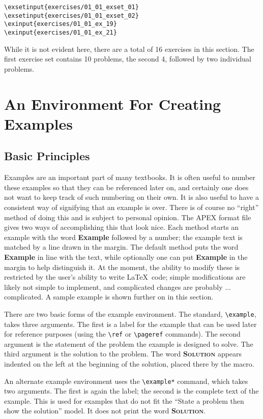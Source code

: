 \documentclass[10pt]{article}
\begin{document}
\begin{verbatim}
\exsetinput{exercises/01_01_exset_01}
\exsetinput{exercises/01_01_exset_02}
\exinput{exercises/01_01_ex_19}
\exinput{exercises/01_01_ex_21}
\end{verbatim}

While it is not evident here, there are a total of 16 exercises in this section. The first exercise set contains 10 problems, the second 4, followed by two individual problems. 

\section{An Environment For Creating Examples}

\subsection{Basic Principles}
Examples are an important part of many textbooks. It is often useful to number these examples so that they can be referenced later on, and certainly one does not want to keep track of such numbering on their own. It is also useful to have a consistent way of signifying that an example is over. There is of course no ``right'' method of doing this and is subject to personal opinion. The APEX format file gives two ways of accomplishing this that look nice. Each method starts an example with the word {\bf Example} followed by a number; the example text is matched by a line drawn in the margin. The default method puts the word {\bf Example} in line with the text, while optionally one can put {\bf Example} in the margin to help distinguish it. At the moment, the ability to modify these is restricted by the user's ability to write \LaTeX\ code; simple modifications are likely not simple to implement, and complicated changes are probably $\ldots$ complicated. A sample example is shown further on in this section.

There are two basic forms of the example environment. The standard, \verb|\example|, takes three arguments. The first is a label for the example that can be used later for reference purposes (using the \verb|\ref| or \verb|\pageref| commands). The second argument is the statement of the problem the example is designed to solve. The third argument is the solution to the problem. The word \textsc{\small\bfseries Solution} appears indented on the left at the beginning of the solution, placed there by the macro.

An alternate example environment uses the \verb|\example*| command, which takes two arguments. The first is again the label; the second is the complete text of the example. This is used for examples that do not fit the ``State a problem then show the solution'' model. It does not print the word \textsc{\small\bfseries Solution}.
\end{document}

